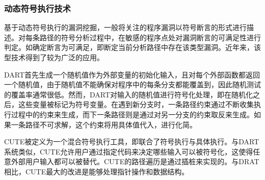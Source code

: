 \subsubsection{动态符号执行技术}


基于动态符号执行的漏洞挖掘，一般将关注的程序漏洞以符号断言的形式进行描述。对每条路径的符号分析过程中，在敏感的程序点处对漏洞断言的可满足性进行判定。如确定断言为可满足，即断定当前分析路径中存在该类型漏洞。近年来，该型技术得到了较为广泛的应用。

DART首先生成一个随机值作为外部变量的初始化输入，且对每个外部函数都返回一个随机值，由于随机值不能确保对程序中的每条分支都能覆盖到，因此随机测试的覆盖率通常很低。然而，DART对输入的随机值进行符号化处理，即在随机化之后，这些变量被标记为符号变量。在遇到新分支时，一条路径约束通过不断收集执行过程中的约束来生成，而下一条路径则是通过对另一分支的约束取反来生成。如果一条路径不可求解，这个约束将用具体值代入，进行化简。

CUTE被定义为一个混合符号执行工具，即联合了符号执行与具体执行。与DART系统类似，CUTE允许用户通过指定代码来决定哪些输入可以被符号化，这使得任意外部用户输入都可以被替代。CUTE的路径遍历是通过插桩来实现的。与DRAT相比，CUTE最大的改进是能够处理指针操作和数据结构。


